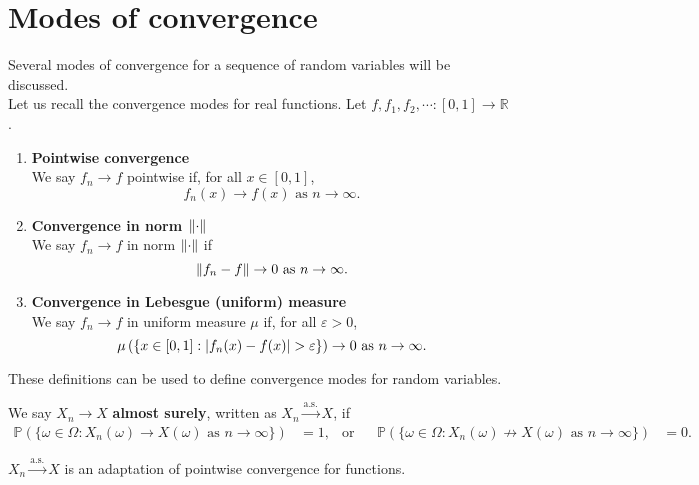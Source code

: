 \documentclass{huhtakm-template-book-v2}
\newcommand{\prob}{\mathbb{P}}
\begin{document}
\section{Modes of convergence}
    Several modes of convergence for a sequence of random variables will be discussed.\\
    Let us recall the convergence modes for real functions. Let $f,f_{1},f_{2},\cdots:[0,1] \to \mathbb{R}$.
    \begin{enumerate}
        \item \textbf{Pointwise convergence}\\
        We say $f_{n} \to f$ pointwise if, for all $x \in [0,1]$,
        \begin{equation*}
            f_{n}(x) \to f(x) \text{ as } n \to \infty.
        \end{equation*}
        \item \textbf{Convergence in norm $\lVert{\cdot}\rVert$}\\
        We say $f_{n} \to f$ in norm $\lVert{\cdot}\rVert$ if
        \begin{equation*}
            \lVert{f_{n}-f}\rVert \to 0 \text{ as } n \to \infty.
        \end{equation*}
        \item \textbf{Convergence in Lebesgue (uniform) measure}\\
        We say $f_{n} \to f$ in uniform measure $\mu$ if, for all $\varepsilon > 0$,
        \begin{equation*}
            \mu\left(\{x \in [0,1]:\left|{f_{n}(x)-f(x)}\right| > \varepsilon\}\right) \to 0 \text{ as } n \to \infty.
        \end{equation*}
    \end{enumerate}
    These definitions can be used to define convergence modes for random variables.
    \begin{defn}
        We say $X_{n} \to X$ \textbf{almost surely}, written as $X_{n} \xrightarrow{\text{a.s.}} X$, if
        \begin{align*}
            \prob(\{\omega \in \Omega:X_{n}(\omega) \to X(\omega) \text{ as } n \to \infty\}) &= 1, & \text{or} & & \prob(\{\omega \in \Omega:X_{n}(\omega) \not\to X(\omega) \text{ as } n \to \infty\}) &= 0.
        \end{align*}
    \end{defn}
    \begin{rem}
        $X_{n} \xrightarrow{\text{a.s.}} X$ is an adaptation of pointwise convergence for functions.
    \end{rem}
\end{document}
